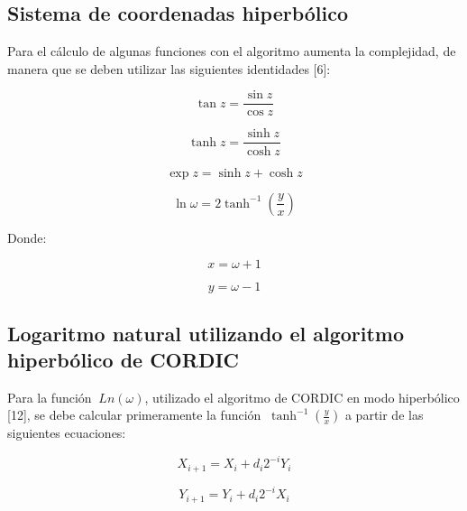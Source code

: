 \subsection{Sistema de coordenadas hiperbólico}

Para el cálculo de algunas funciones con el algoritmo aumenta la complejidad, de manera que se deben utilizar las siguientes identidades [6]:

\begin{equation} \label{eq:ej17}
  \tan z = \frac{\sin z}{\cos z}
\end{equation}

\begin{equation} \label{eq:ej18}
  \tanh z = \frac{\sinh z}{\cosh z}
\end{equation}

\begin{equation} \label{eq:ej19}
  \exp z = \sinh z + \cosh z
\end{equation}

\begin{equation} \label{eq:ej20}
  \ln \omega = 2 \tanh^{-1} \left( \frac{y}{x} \right)
\end{equation}

Donde: 

\begin{equation} \label{eq:ej21}
  x = \omega + 1
\end{equation}

\begin{equation} \label{eq:ej22}
  y = \omega - 1
\end{equation}

\subsection{Logaritmo natural utilizando el algoritmo hiperbólico de CORDIC}
Para la función $\ Ln \left(\omega\right) $, utilizado el algoritmo de CORDIC en modo hiperbólico [12], se debe calcular primeramente la función $\ \tanh^{-1} \left( \frac{y}{x} \right)$ a partir de las siguientes ecuaciones:

 
\begin{equation} \label{eq:ej23}
  X_{i+1} = X_{i} + d_{i} 2^{-i} Y_{i}  
\end{equation}

\begin{equation} \label{eq:ej24}
  Y_{i+1} = Y_{i} + d_{i} 2^{-i} X_{i}  
\end{equation}


